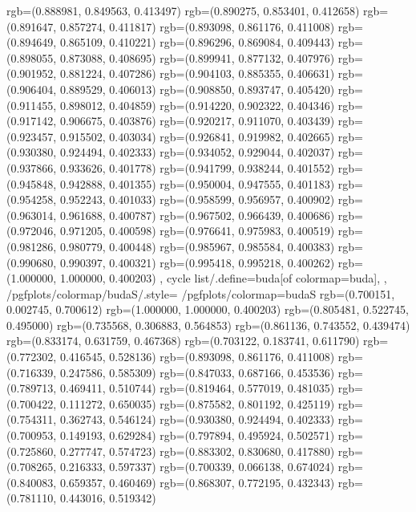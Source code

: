 {{{					rgb=(0.888981, 0.849563, 0.413497)
					rgb=(0.890275, 0.853401, 0.412658)
					rgb=(0.891647, 0.857274, 0.411817)
					rgb=(0.893098, 0.861176, 0.411008)
					rgb=(0.894649, 0.865109, 0.410221)
					rgb=(0.896296, 0.869084, 0.409443)
					rgb=(0.898055, 0.873088, 0.408695)
					rgb=(0.899941, 0.877132, 0.407976)
					rgb=(0.901952, 0.881224, 0.407286)
					rgb=(0.904103, 0.885355, 0.406631)
					rgb=(0.906404, 0.889529, 0.406013)
					rgb=(0.908850, 0.893747, 0.405420)
					rgb=(0.911455, 0.898012, 0.404859)
					rgb=(0.914220, 0.902322, 0.404346)
					rgb=(0.917142, 0.906675, 0.403876)
					rgb=(0.920217, 0.911070, 0.403439)
					rgb=(0.923457, 0.915502, 0.403034)
					rgb=(0.926841, 0.919982, 0.402665)
					rgb=(0.930380, 0.924494, 0.402333)
					rgb=(0.934052, 0.929044, 0.402037)
					rgb=(0.937866, 0.933626, 0.401778)
					rgb=(0.941799, 0.938244, 0.401552)
					rgb=(0.945848, 0.942888, 0.401355)
					rgb=(0.950004, 0.947555, 0.401183)
					rgb=(0.954258, 0.952243, 0.401033)
					rgb=(0.958599, 0.956957, 0.400902)
					rgb=(0.963014, 0.961688, 0.400787)
					rgb=(0.967502, 0.966439, 0.400686)
					rgb=(0.972046, 0.971205, 0.400598)
					rgb=(0.976641, 0.975983, 0.400519)
					rgb=(0.981286, 0.980779, 0.400448)
					rgb=(0.985967, 0.985584, 0.400383)
					rgb=(0.990680, 0.990397, 0.400321)
					rgb=(0.995418, 0.995218, 0.400262)
					rgb=(1.000000, 1.000000, 0.400203)
			},
		cycle list/.define={buda}{[of colormap=buda]},
		},
		/pgfplots/colormap/budaS/.style={
			/pgfplots/colormap={budaS}{%
					rgb=(0.700151, 0.002745, 0.700612)
					rgb=(1.000000, 1.000000, 0.400203)
					rgb=(0.805481, 0.522745, 0.495000)
					rgb=(0.735568, 0.306883, 0.564853)
					rgb=(0.861136, 0.743552, 0.439474)
					rgb=(0.833174, 0.631759, 0.467368)
					rgb=(0.703122, 0.183741, 0.611790)
					rgb=(0.772302, 0.416545, 0.528136)
					rgb=(0.893098, 0.861176, 0.411008)
					rgb=(0.716339, 0.247586, 0.585309)
					rgb=(0.847033, 0.687166, 0.453536)
					rgb=(0.789713, 0.469411, 0.510744)
					rgb=(0.819464, 0.577019, 0.481035)
					rgb=(0.700422, 0.111272, 0.650035)
					rgb=(0.875582, 0.801192, 0.425119)
					rgb=(0.754311, 0.362743, 0.546124)
					rgb=(0.930380, 0.924494, 0.402333)
					rgb=(0.700953, 0.149193, 0.629284)
					rgb=(0.797894, 0.495924, 0.502571)
					rgb=(0.725860, 0.277747, 0.574723)
					rgb=(0.883302, 0.830680, 0.417880)
					rgb=(0.708265, 0.216333, 0.597337)
					rgb=(0.700339, 0.066138, 0.674024)
					rgb=(0.840083, 0.659357, 0.460469)
					rgb=(0.868307, 0.772195, 0.432343)
					rgb=(0.781110, 0.443016, 0.519342)
}}}
